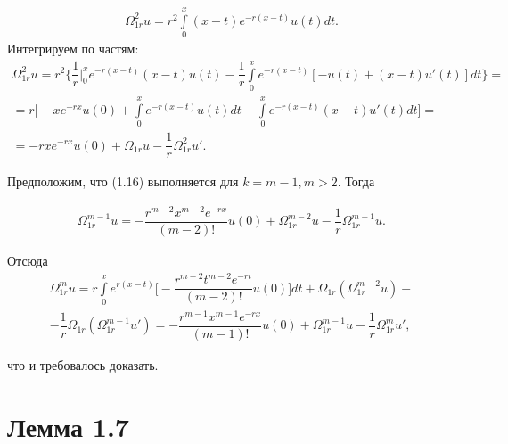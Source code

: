 \begin{equation}
\begin{array}{c}
\nonumber

\Omega_{1r}^2u = r^2\int\limits_0^x (x-t)e^{-r(x-t)}u(t)dt.

\end{array}
\end{equation}
Интегрируем по частям:
\begin{equation}
\begin{array}{c}
\nonumber

\Omega_{1r}^2u = r^2\biggl\lbrace \dfrac{1}{r} \Big\vert_0^x e^{-r(x-t)}(x-t)u(t) - \dfrac{1}{r} \int\limits_0^x e^{-r(x-t)}[-u(t) + (x - t)u'(t)]dt \biggr\rbrace = \\
= r \biggl[ -xe^{-rx}u(0) + \int\limits_0^x e^{-r(x-t)}u(t)dt - \int\limits_0^x e^{-r(x-t)}(x-t)u'(t)dt \biggr] = \\
= -rxe^{-rx}u(0) + \Omega_{1r}u - \dfrac{1}{r}\Omega_{1r}^2u'.

\end{array}
\end{equation}

Предположим, что (1.16) выполняется для $ k = m - 1, m > 2 $. Тогда

\begin{equation}
\begin{array}{c}
\nonumber

\Omega_{1r}^{m-1}u = -\dfrac{r^{m-2}x^{m-2}e^{-rx}}{(m-2)!}u(0) + \Omega_{1r}^{m-2}u - \dfrac{1}{r}\Omega_{1r}^{m-1}u.

\end{array}
\end{equation}

Отсюда
\begin{equation}
\begin{array}{c}
\nonumber

\Omega_{1r}^mu = r\int\limits_0^x e^{r(x-t)}\biggl[ -\dfrac{r^{m-2}t^{m-2}e^{-rt}}{(m-2)!}u(0) \biggr]dt +  \Omega_{1r}(\Omega_{1r}^{m-2}u) - \\
- \dfrac{1}{r}\Omega_{1r}(\Omega_{1r}^{m-1}u') = -\dfrac{r^{m-1}x^{m-1}e^{-rx}}{(m-1)!}u(0) + \Omega_{1r}^{m-1}u - \dfrac{1}{r}\Omega_{1r}^mu',

\end{array}
\end{equation}

что и требовалось доказать.

\section{Лемма 1.7}
\label{lemma1.7}

